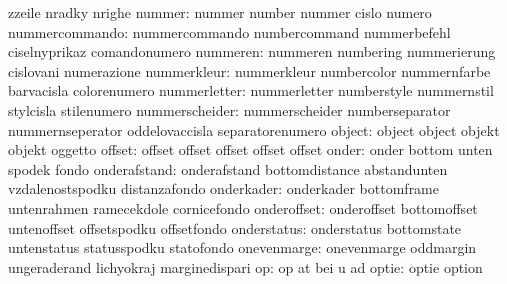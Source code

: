                            zzeile                    nradky
                           nrighe
                   nummer: nummer                    number
                           nummer                    cislo
                           numero
           nummercommando: nummercommando            numbercommand
                           nummerbefehl              ciselnyprikaz
                           comandonumero
                 nummeren: nummeren                  numbering
                           nummerierung              cislovani
                           numerazione
              nummerkleur: nummerkleur               numbercolor
                           nummernfarbe              barvacisla
                           colorenumero
             nummerletter: nummerletter              numberstyle
                           nummernstil               stylcisla
                           stilenumero
           nummerscheider: nummerscheider            numberseparator
                           nummernseperator          oddelovaccisla
                           separatorenumero
                   object: object                    object
                           objekt                    objekt
                           oggetto
                   offset: offset                    offset
                           offset                    offset
                           offset
                    onder: onder                     bottom
                           unten                     spodek
                           fondo
             onderafstand: onderafstand              bottomdistance
                           abstandunten              vzdalenostspodku
                           distanzafondo
               onderkader: onderkader                bottomframe
                           untenrahmen               ramecekdole
                           cornicefondo
              onderoffset: onderoffset               bottomoffset
                           untenoffset               offsetspodku
                           offsetfondo
              onderstatus: onderstatus               bottomstate
                           untenstatus               statusspodku
                           statofondo
              onevenmarge: onevenmarge               oddmargin
                           ungeraderand              lichyokraj
                           marginedispari
                       op: op                        at
                           bei                       u
                           ad                         
                    optie: optie                     option
